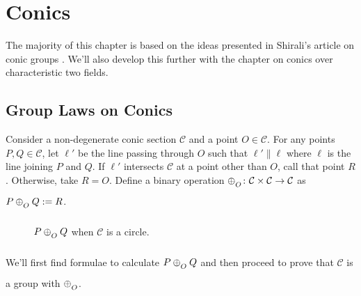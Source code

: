 \chapter{Conics} \label{ch:conics}

The majority of this chapter is based on the ideas presented in Shirali's article
on conic groups \cite{shirali}. We'll also develop this further with the chapter
on conics over characteristic two fields.

\section{Group Laws on Conics}

Consider a non-degenerate conic section $\mathcal{C}$ and a point $O \in
\mathcal{C}$. For any points $P,Q\in\mathcal{C}$, let $\ell'$ be the line passing
through $O$ such that $\ell' \parallel \ell$ where $\ell$ is the line joining $P$
and $Q$. If $\ell'$ intersects $\mathcal{C}$ at a point other than $O$, call that
point $R$. Otherwise, take $R=O$. Define a binary operation
$\conop\colon \mathcal{C} \times \mathcal{C} \to \mathcal{C}$ as $P \conop Q := R$.
\vspace{1ex}

\begin{figure}[H]
    \center

    \caption{$P \conop Q$ when $\mathcal{C}$ is a circle.}
\end{figure}

We'll first find formulae to calculate $P \conop Q$ and then proceed to prove
that $\mathcal{C}$ is a group with $\conop$.

